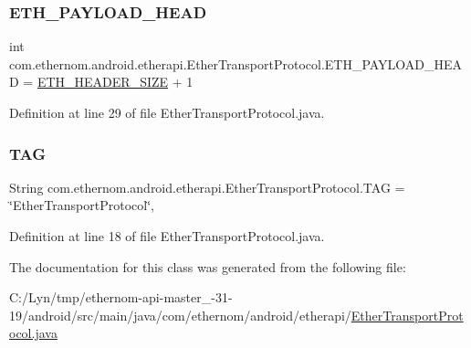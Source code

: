 \subsubsection{\texorpdfstring{E\+T\+H\+\_\+\+P\+A\+Y\+L\+O\+A\+D\+\_\+\+H\+E\+AD}{ETH\_PAYLOAD\_HEAD}}
{\footnotesize\ttfamily int com.\+ethernom.\+android.\+etherapi.\+Ether\+Transport\+Protocol.\+E\+T\+H\+\_\+\+P\+A\+Y\+L\+O\+A\+D\+\_\+\+H\+E\+AD = \mbox{\hyperlink{classcom_1_1ethernom_1_1android_1_1etherapi_1_1_ether_transport_protocol_a4582a566e69ab602b9c7701a087e20b7}{E\+T\+H\+\_\+\+H\+E\+A\+D\+E\+R\+\_\+\+S\+I\+ZE}} + 1\hspace{0.3cm}{\ttfamily [static]}}



Definition at line 29 of file Ether\+Transport\+Protocol.\+java.

\mbox{\label{classcom_1_1ethernom_1_1android_1_1etherapi_1_1_ether_transport_protocol_aae9d17346d7cae7f3ca5c3962630381e}} 
\subsubsection{\texorpdfstring{T\+AG}{TAG}}
{\footnotesize\ttfamily String com.\+ethernom.\+android.\+etherapi.\+Ether\+Transport\+Protocol.\+T\+AG = \char`\"{}Ether\+Transport\+Protocol\char`\"{}\hspace{0.3cm}{\ttfamily [static]}, {\ttfamily [package]}}



Definition at line 18 of file Ether\+Transport\+Protocol.\+java.



The documentation for this class was generated from the following file\+:\begin{DoxyCompactItemize}
\item 
C\+:/\+Lyn/tmp/ethernom-\/api-\/master\+\_-\/31-\/19/android/src/main/java/com/ethernom/android/etherapi/\mbox{\hyperlink{_ether_transport_protocol_8java}{Ether\+Transport\+Protocol.\+java}}\end{DoxyCompactItemize}
